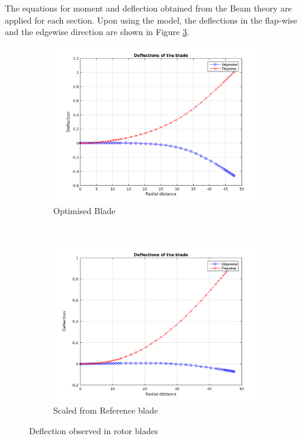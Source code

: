The equations for moment and deflection obtained from the Beam theory are applied for each section. Upon using the model, the deflections in the flap-wise and the edgewise direction are shown in Figure \ref{fig:deflection}.

\begin{figure}[H] 
\hspace*{-2.cm}
\centering
\begin{subfigure}{0.60\textwidth}
\includegraphics[width=\linewidth]{Images/deflection_optimal_no_correction.png} 
\caption{Optimised Blade}
\label{fig:deflection_optimal_1}
\end{subfigure}~
\begin{subfigure}{0.60\textwidth}
\includegraphics[width=\linewidth]{Images/deflection_scaled.png}
\caption{Scaled from Reference blade}
\label{fig:deflection_scaled}
\end{subfigure}
\caption{Deflection observed in rotor blades}
\label{fig:deflection}
\end{figure}



